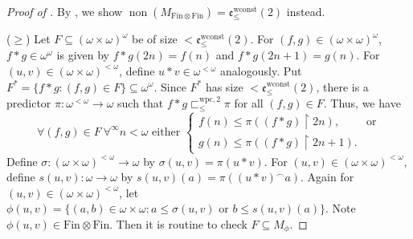 \documentclass[a4paper,12pt]{amsart}
\theoremstyle{definition}
\numberwithin{thm}{section}
\numberwithin{equation}{section}
\newcommand{\ee}{\mathfrak{e}}
\DeclareMathOperator{\non}{non}
\newcommand{\finfin}{\mathrm{Fin}\otimes\mathrm{Fin}}
\renewcommand{\subset}{\subseteq}
\begin{document}
    \begin{proof}[Proof of ]
        By , we show $\non(M_{\finfin}) = \ee^\mathrm{wconst}_{\leq}(2)$ instead.
    
        ($\geq$) Let $F\subseteq(\omega\times\omega)^\omega$ be of size $<\ee^\mathrm{wconst}_{\leq}(2)$. For $(f,g)\in (\omega\times\omega)^\omega$, $f*g\in\omega^\omega$ is given by $f*g(2n)= f(n)$ and $f*g(2n+1)= g(n)$. 
        For $(u,v)\in(\omega\times\omega)^{<\omega}$, define $u*v\in\omega^{<\omega}$ analogously.
        Put $F^*=\{f*g:(f,g)\in F\}\subseteq\omega^\omega$. Since $F^*$ has size $<\ee^\mathrm{wconst}_{\leq}(2)$, there is a predictor $\pi\colon\omega^{<\omega}\to\omega$ such that $f*g\sqsubset^{\mathrm{wpc}, 2}_{\leq}\pi$ for all $(f,g)\in F$. Thus, we have
    	\begin{equation*}
    		\forall (f,g)\in F~\forall^\infty n<\omega\text{ either }
    		\begin{cases}
    			f(n)\leq\pi((f*g)\upharpoonright 2n), & \text{or} \\
    			g(n)\leq\pi((f*g)\upharpoonright 2n+1).         &
    		\end{cases}
    	\end{equation*}
    	Define $\sigma\colon(\omega\times\omega)^{<\omega}\to\omega$ by $\sigma(u,v)=\pi(u*v)$. For $(u,v)\in (\omega\times\omega)^{<\omega}$, define $s(u,v)\colon\omega\to\omega$ by $s(u,v)(a)=\pi((u*v)^\frown a)$. Again for $(u,v)\in (\omega\times\omega)^{<\omega}$, let $\phi(u,v)=\{(a,b)\in\omega\times\omega:a\leq\sigma(u,v)\text{ or }b \leq s(u,v)(a)\}$. Note $\phi(u,v)\in\finfin$. Then it is routine to check $F\subset M_\phi$.
    

\end{proof}
\end{document}
